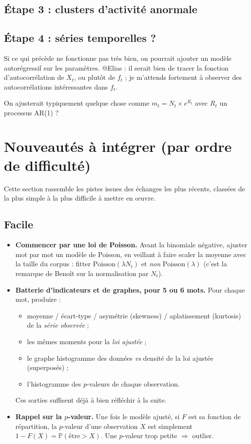 \documentclass[12pt,a4paper]{article}
\begin{document}
\subsection{Étape 3 : clusters d'activité anormale}

\subsection{Étape 4 : séries temporelles ?}

Si ce qui précède ne fonctionne pas très bien, on pourrait ajouter un modèle autorégressif sur les paramètres. @Elias : il serait bien de tracer la fonction d'autocorrélation de $X_t$, ou plutôt de $f_t$ ; je m'attends fortement à observer des autocorrélations intéressantes dans $f_t$.

On ajusterait typiquement quelque chose comme $m_t = N_t \times e^{R_t}$ avec $R_t$ un processus AR(1) ?

\newpage
\section{Nouveautés à intégrer (par ordre de difficulté)}

Cette section rassemble les pistes issues des échanges les plus récents,
classées de la plus simple à la plus difficile à mettre en œuvre.

\subsection*{Facile}

\begin{itemize}
    \item \textbf{Commencer par une loi de Poisson.} Avant la binomiale négative,
    ajuster mot par mot un modèle de Poisson, en veillant à faire scaler la moyenne
    avec la taille du corpus : fitter $\mathrm{Poisson}(\lambda N_t)$ et \emph{non}
    $\mathrm{Poisson}(\lambda)$ (c'est la remarque de Benoît sur la normalisation par $N_t$).

    \item \textbf{Batterie d'indicateurs et de graphes, pour 5 ou 6 mots.} Pour chaque mot,
    produire :
    \begin{itemize}
        \item moyenne / écart-type / asymétrie (skewness) / aplatissement (kurtosis)
        de la \emph{série observée} ;
        \item les mêmes moments pour la \emph{loi ajustée} ;
        \item le graphe histogramme des données \emph{vs} densité de la loi ajustée (superposés) ;
        \item l'histogramme des $p$-valeurs de chaque observation.
    \end{itemize}
    Ces sorties suffisent déjà à bien réfléchir à la suite.

    \item \textbf{Rappel sur la $p$-valeur.} Une fois le modèle ajusté, si $F$ est sa
    fonction de répartition, la $p$-valeur d'une observation $X$ est simplement
    $1 - F(X) = \mathbb{P}(\text{être} > X)$. Une $p$-valeur trop petite $\Rightarrow$ outlier.
\end{itemize}
\end{document}
